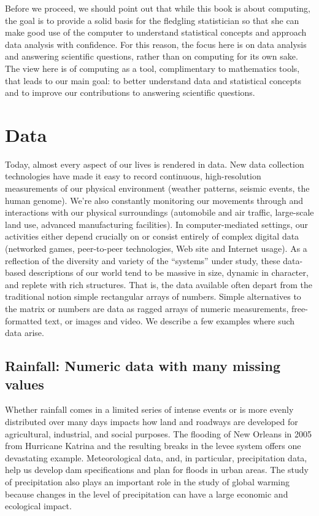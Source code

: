 Before we proceed, we should point out that while this book is about
computing, the goal is to provide a solid basis for the fledgling
statistician so that she can make good use of the computer to
understand statistical concepts and approach data analysis with
confidence.  For this reason, the focus here is on data analysis and
answering scientific questions, rather than on computing for its own
sake. The view here is of computing as a tool, complimentary to
mathematics tools, that leads to our main goal: to better understand data and
statistical concepts and to improve our contributions to  answering scientific
questions.


\section{Data} 
Today, almost every aspect of our lives is rendered in data.  New data
collection technologies have made it easy to record continuous,
high-resolution measurements of our physical environment (weather
patterns, seismic events, the human genome). We're also constantly
monitoring our movements through and interactions with our physical
surroundings (automobile and air traffic, large-scale land use,
advanced manufacturing facilities). In computer-mediated settings, our
activities either depend crucially on or consist entirely of complex
digital data (networked games, peer-to-peer technologies, Web site and
Internet usage).  As a reflection of the diversity and variety of the
``systems'' under study, these data-based descriptions of our world
tend to be massive in size, dynamic in character, and replete with
rich structures.    That is, the data available often depart from  the traditional 
notion simple rectangular arrays of numbers.  Simple alternatives to
the matrix or numbers  are data as ragged arrays of numeric measurements, 
free-formatted text, or images and video.  We describe a few examples 
where such data arise.    


\subsection{Rainfall: Numeric data with many missing values}

Whether rainfall comes in a limited series of intense events or is
more evenly distributed over many days impacts how land and roadways
are developed for agricultural, industrial, and social purposes.  The
flooding of New Orleans in 2005 from Hurricane Katrina and the
resulting breaks in the levee system offers one devastating example.
Meteorological data, and, in particular, precipitation data, help us
develop dam specifications and plan for floods in urban areas.  The
study of precipitation also plays an important role in the study of
global warming because changes in the level of precipitation can have
a large economic and ecological impact.


